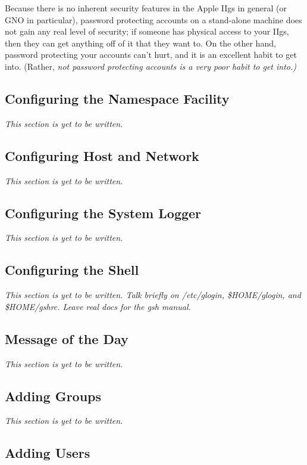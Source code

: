 \documentclass{report}
\begin{document}
Because there is no inherent security features in the Apple IIgs in general
(or GNO in particular), password protecting accounts on a stand-alone
machine does not gain any real level of security; if someone has physical
access to your IIgs, then they can get anything off of it that they want
to.  On the other hand, password protecting your accounts can't hurt, and
it is an excellent habit to get into.  (Rather, \em not \rm password 
protecting accounts is a very poor habit to get into.)

\subsection{Configuring the Namespace Facility}

\em This section is yet to be written. \rm

\subsection{Configuring Host and Network}

\em This section is yet to be written. \rm

\subsection{Configuring the System Logger}

\em This section is yet to be written. \rm

\subsection{Configuring the Shell}

\em This section is yet to be written. 
Talk briefly on /etc/glogin, \$HOME/glogin, and \$HOME/gshrc.
Leave real docs for the gsh manual.
\rm

\subsection{Message of the Day}

\em This section is yet to be written. \rm

\subsection{Adding Groups}

\em This section is yet to be written. \rm

\subsection{Adding Users}
\end{document}
